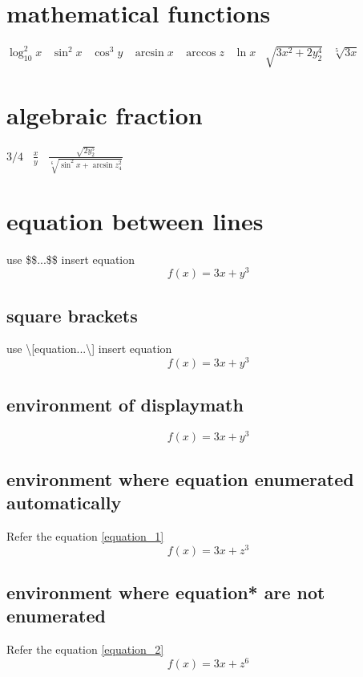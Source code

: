 \documentclass{article}
\begin{document}
    \section{mathematical functions}
    \(\log_{10}^2 x\)
    \ \(\sin^2 x\)
    \ \(\cos^3 y\)
    \ \(\arcsin x\)
    \ \(\arccos z\)
    \ \(\ln x\)
    \ \(\sqrt{3x^2+2y^4_2}\)
    \ \(\sqrt[5]{3x}\)

    \section{algebraic fraction}
    \(3/4\)
    \ \(\frac{x}{y}\)
    \ \(\frac{\sqrt{2y_2^5}}{\sqrt[6]{\sin^2 x+\arcsin z_4^2}}\)

    \section{equation between lines}

    use \$\$...\$\$ insert equation
    $$f(x)=3x+y^3$$    
    
    \subsection{square brackets}
    use \textbackslash [equation...\textbackslash ] insert equation
    \[f(x)=3x+y^3\] %
    
    \subsection{environment of displaymath}
    \begin{displaymath}
        f(x)=3x+y^3
    \end{displaymath}
    
    \subsection{environment where equation enumerated automatically}
    Refer the equation \ref{equation_1}
    \begin{equation}
        f(x)=3x+z^3 
        \label{equation_1}
    \end{equation}
    
    \subsection{environment where equation* are not enumerated }
    Refer the equation \ref{equation_2}
    \begin{equation*} %
        f(x)=3x+z^6
        \label{equation_2}
    \end{equation*}
\end{document}
